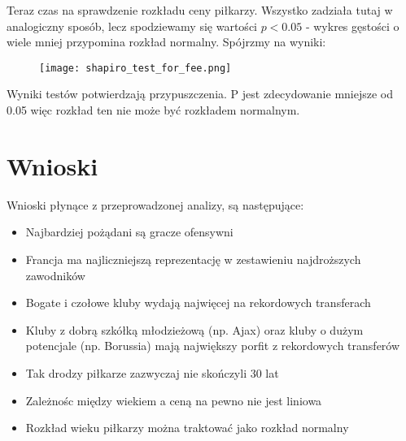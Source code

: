 \documentclass{article}
\begin{document}
Teraz czas na sprawdzenie rozkładu ceny piłkarzy. Wszystko zadziała tutaj w analogiczny sposób, lecz spodziewamy się wartości $p<0.05$ - wykres gęstości o wiele mniej przypomina rozkład normalny. Spójrzmy na wyniki:
\begin{figure}[H]
    \centering
    \texttt{[image: shapiro\_test\_for\_fee.png]}
\end{figure}
Wyniki testów potwierdzają przypuszczenia. P jest zdecydowanie mniejsze od 0.05 więc rozkład ten nie może być rozkładem normalnym.


\section{Wnioski}
Wnioski płynące z przeprowadzonej analizy, są następujące:
\begin{itemize}
\item Najbardziej pożądani są gracze ofensywni
\item Francja ma najliczniejszą reprezentację w zestawieniu najdroższych zawodników
\item Bogate i czołowe kluby wydają najwięcej na rekordowych transferach
\item Kluby z dobrą szkółką młodzieżową (np. Ajax) oraz kluby o dużym potencjale (np. Borussia) mają największy porfit z rekordowych transferów
\item Tak drodzy piłkarze zazwyczaj nie skończyli 30 lat
\item Zależnośc między wiekiem a ceną na pewno nie jest liniowa
\item Rozkład wieku piłkarzy można traktować jako rozkład normalny
\end{itemize}
\end{document}

